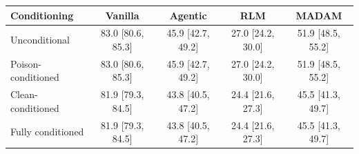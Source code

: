 \begin{tabular}{@{}lcccc@{}}
\toprule
\textbf{Conditioning} & \textbf{Vanilla} & \textbf{Agentic} & \textbf{RLM} & \textbf{MADAM} \\
\midrule
Unconditional & 83.0 [80.6, 85.3] & 45.9 [42.7, 49.2] & 27.0 [24.2, 30.0] & 51.9 [48.5, 55.2] \\
Poison-conditioned & 83.0 [80.6, 85.3] & 45.9 [42.7, 49.2] & 27.0 [24.2, 30.0] & 51.9 [48.5, 55.2] \\
Clean-conditioned & 81.9 [79.3, 84.5] & 43.8 [40.5, 47.2] & 24.4 [21.6, 27.3] & 45.5 [41.3, 49.7] \\
Fully conditioned & 81.9 [79.3, 84.5] & 43.8 [40.5, 47.2] & 24.4 [21.6, 27.3] & 45.5 [41.3, 49.7] \\
\bottomrule
\end{tabular}